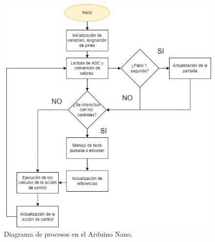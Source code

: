\begin{figure}[H]
    \centering
    \includegraphics[scale=0.3]{./imagenes/DiagramaDeSoftware.jpg}
    \caption{Diagrama de procesos en el Arduino Nano.}
    \label{F:diagrama_de_procesos}
\end{figure}

